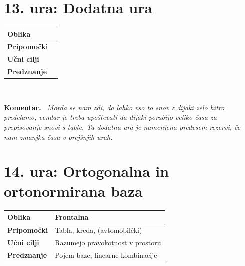 \documentclass[a4paper,11pt]{article}
\newenvironment{komentar}{%
  \par\medskip\noindent\textbf{Komentar.}\itshape\ }{\par\medskip}
\begin{document}
\section{13. ura: Dodatna ura }
\begin{tabularx}{\textwidth}{|>{\bfseries\RaggedRight}p{2.7cm}|X|}
\hline
Oblika &  \\ \hline
Pripomočki &  \\ \hline
Učni cilji &  \\ \hline
Predznanje & \\ \hline

\end{tabularx}
\\

\begin{komentar}
    Morda se nam zdi, da lahko vso to snov z dijaki zelo hitro predelamo, vendar je treba upoštevati da dijaki porabijo veliko časa za prepisovanje snovi s table. Ta dodatna ura je namenjena predvsem rezervi, če nam zmanjka časa v prejšnjih urah.
\end{komentar}
\newpage
\section{14. ura: Ortogonalna in ortonormirana baza}
\begin{tabularx}{\textwidth}{|>{\bfseries\RaggedRight}p{2.7cm}|X|}
\hline
Oblika & Frontalna \\ \hline
Pripomočki & Tabla, kreda, (avtomobilčki) \\ \hline
Učni cilji & Razumejo pravokotnost v prostoru \\ \hline
Predznanje & Pojem baze, linearne kombinacije\\ \hline

\end{tabularx}
\\
\end{document}
